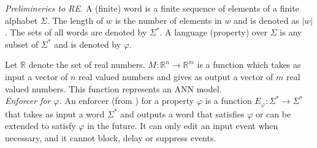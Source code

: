 \noindent \textit{Prelimineries to RE.} A (finite) word is a finite sequence of elements of a finite alphabet $ \Sigma $. 
The length of $ w $ is the number of elements in $ w $ and is denoted as $ | w | $.  
The sets of all words are denoted by $ \Sigma^{\ast} $. 
A language (property) over $ \Sigma $ is any subset of $ \Sigma^{\ast} $ and is denoted by $\varphi$. 

Let $\mathbb{R}$ denote the set of real numbers. $M:\mathbb{R}^n \rightarrow \mathbb{R}^m$ is a function which takes as input a vector of $n$ real valued numbers and gives as output a vector of $m$ real valued numbers. This function represents an ANN model. \\


\noindent \textit{Enforcer for $\varphi$.} An enforcer (from \cite{pearce_smart_2020}) for a property $\varphi$ is a function $E_{\varphi} : \Sigma^{\ast} \rightarrow \Sigma^{\ast}$ that takes as input a word $\Sigma^{\ast} $ and outputs a word that satisfies $\varphi$ or can be extended to satisfy $\varphi$ in the future. It can only edit an input event when necessary, and it cannot block, delay or suppress events.\\

